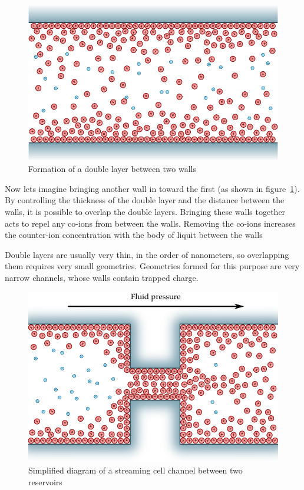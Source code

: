     \begin{figure}
        \centering
        \includegraphics{content/pt1/01-PowerHarvesting/graphics/doubleLayerOnWalls}
        \caption{\label{fig:doubleLayerBetweenWalls}Formation of a double layer between two  walls}
    \end{figure}

    Now lets imagine bringing another wall in toward the first (as shown in figure~\ref{fig:doubleLayerBetweenWalls}).
    By controlling the thickness of the double layer and the distance between the walls, it is possible to overlap the double layers.
    Bringing these walls together acts to repel any co-ions from between the walls.
    Removing the co-ions increases the counter-ion concentration with the body of liquit between the walls

    Double layers are usually very thin, in the order of nanometers, so overlapping them requires very small geometries.
    Geometries formed for this purpose are very narrow channels, whose walls contain trapped charge.


    \begin{figure}
        \centering
        \includegraphics{content/pt1/01-PowerHarvesting/graphics/streamingCell}
        \caption{\label{fig:streamingCellChannel} Simplified diagram of a streaming cell channel between two reservoirs}
    \end{figure}



